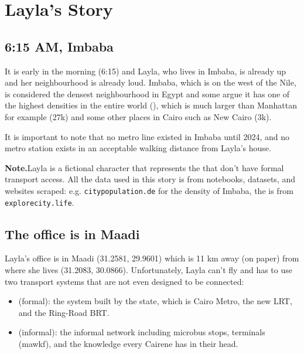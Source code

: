 
\section{Layla's Story}
\label{sec:layla}

\subsection{6:15 AM, Imbaba}

It is early in the morning (6:15) and Layla, who lives in Imbaba, is
already up and her neighbourhood is already loud. Imbaba, which is on
the west of the Nile, is considered the densest neighbourhood in Egypt
and some argue it has one of the highest densities in the entire world
(), which is much larger than
Manhattan for example (27k) and some other places in Cairo such as New
Cairo (3k).

It is important to note that no metro line existed in Imbaba until
2024, and no metro station exists in an acceptable walking distance
from Layla's house.

\begin{callout}
\textbf{\color{plotblue}Note.}\quad Layla is a fictional character that
represents the  that don't have formal
transport access. All the data used in this story is from notebooks,
datasets, and websites scraped: e.g. \texttt{citypopulation.de} for
the density of Imbaba, the  is from
\texttt{explorecity.life}.
\end{callout}

\subsection{The office is in Maadi}

Layla's office is in Maadi (31.2581, 29.9601) which is 11 km away (on
paper) from where she lives (31.2083, 30.0866). Unfortunately, Layla
can't fly and has to use two transport systems that are not even
designed to be connected:

\begin{itemize}
  \item {} (formal): the system built by the state, which
        is Cairo Metro, the new LRT, and the Ring-Road BRT.
  \item {} (informal): the informal network including
         microbus stops,  terminals (mawkf),
        and the knowledge every Cairene has in their head.
\end{itemize}

